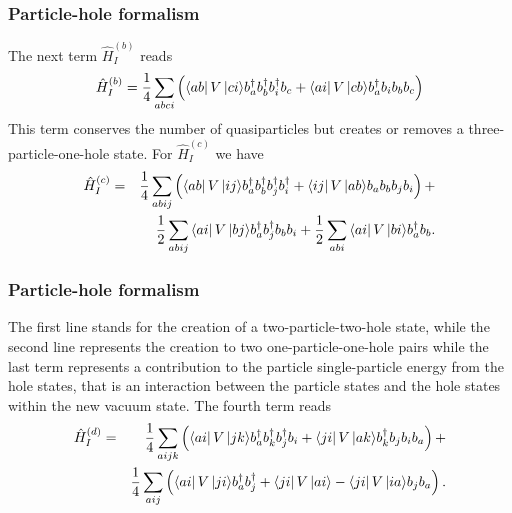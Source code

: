 {
  \frametitle{Particle-hole formalism}
\begin{small}
{\scriptsize
The next term $\hat{H}_I^{(b)}$  reads
\begin{equation}
	 \hat{H}_I^{(b)} = \frac{1}{4} \sum_{abci}\left(\element{ab}{V}{ci}b_a^\dagger b_b^\dagger b_i^\dagger b_c +\element{ai}{V}{cb}
		b_a^\dagger b_i b_b b_c\right) \label{eq:2-67b}
\end{equation}
This term conserves the number of quasiparticles but creates or removes a 
three-particle-one-hole  state. 
For $\hat{H}_I^{(c)}$  we have
\begin{eqnarray}
	\hat{H}_I^{(c)}& =& \frac{1}{4}
		\sum_{abij}\left(\element{ab}{V}{ij}b_a^\dagger b_b^\dagger b_j^\dagger b_i^\dagger +
		\element{ij}{V}{ab}b_a  b_b b_j b_i \right)+  \nonumber \\
	&&	\frac{1}{2}\sum_{abij}\element{ai}{V}{bj}b_a^\dagger b_j^\dagger b_b b_i + 
		\frac{1}{2}\sum_{abi}\element{ai}{V}{bi}b_a^\dagger b_b. \label{eq:2-68c}
\end{eqnarray}
}
\end{small}
}


\frame
{
  \frametitle{Particle-hole formalism}
\begin{small}
{\scriptsize
The first line stands for the creation of a two-particle-two-hole state, while the second line represents
the creation to two one-particle-one-hole pairs
while the last term represents a contribution to the particle single-particle energy
from the hole states, that is an interaction between the particle states and the hole states
within the new vacuum  state.
The fourth term reads
\begin{eqnarray}
	 \hat{H}_I^{(d)}& = &\frac{1}{4} 
	 	\sum_{aijk}\left(\element{ai}{V}{jk}b_a^\dagger b_k^\dagger b_j^\dagger b_i+
\element{ji}{V}{ak}b_k^\dagger b_j b_i b_a\right)+\nonumber \\
&&\frac{1}{4}\sum_{aij}\left(\element{ai}{V}{ji}b_a^\dagger b_j^\dagger+
\element{ji}{V}{ai} - \element{ji}{V}{ia}b_j b_a \right). \label{eq:2-69d} 
\end{eqnarray}
}
\end{small}
}


